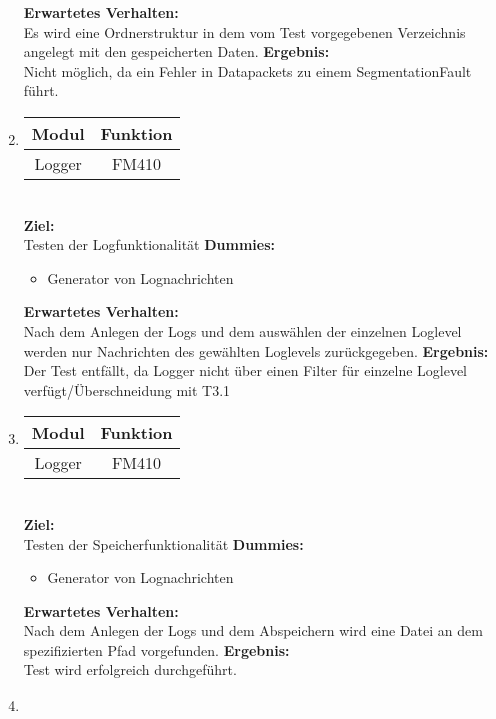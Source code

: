\begin{enumerate}[align=left, leftmargin=4em, label={\textbf{\textbackslash T2.\arabic*\textbackslash}} ]
\begin{itemize}
		\end{itemize}
		\subitem \textbf{Erwartetes Verhalten:}\\
		Es wird eine Ordnerstruktur in dem vom Test vorgegebenen Verzeichnis angelegt mit den gespeicherten Daten.
		\subitem \textbf{Ergebnis:}\\
		Nicht möglich, da ein Fehler in Datapackets zu einem SegmentationFault führt.
		\\\item \begin{tabular}{|c|c|}
			\hline Modul & Funktion \\
			\hline Logger & FM410 \\
			\hline
		\end{tabular}\\
		\subitem \textbf{Ziel:} \\ Testen der Logfunktionalität
		\subitem \textbf{Dummies:} \begin{itemize}
			\item Generator von Lognachrichten
		\end{itemize}
		\subitem \textbf{Erwartetes Verhalten:}\\
		Nach dem Anlegen der Logs und dem auswählen der einzelnen Loglevel werden nur Nachrichten des gewählten Loglevels zurückgegeben.
		\subitem \textbf{Ergebnis:}\\
		Der Test entfällt, da Logger nicht über einen Filter für einzelne Loglevel verfügt/Überschneidung mit T3.1
		\\\item \begin{tabular}{|c|c|}
			\hline Modul & Funktion \\
			\hline Logger & FM410 \\
			\hline
		\end{tabular}\\
		\subitem \textbf{Ziel:} \\ Testen der Speicherfunktionalität
		\subitem \textbf{Dummies:} \begin{itemize}
			\item Generator von Lognachrichten
		\end{itemize}
		\subitem \textbf{Erwartetes Verhalten:}\\
		Nach dem Anlegen der Logs und dem Abspeichern wird eine Datei an dem spezifizierten Pfad vorgefunden.
		\subitem \textbf{Ergebnis:}\\
		Test wird erfolgreich durchgeführt.
		\\\item \begin{tabular}{|c|c|}

\end{tabular}
\end{enumerate}
